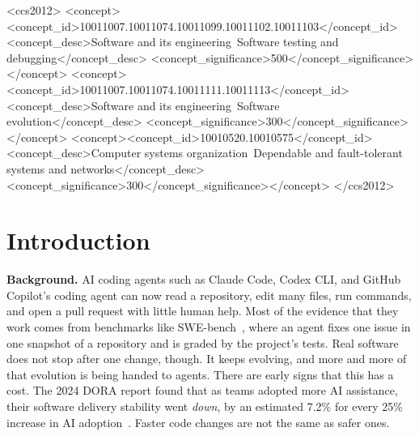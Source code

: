 \documentclass[sigconf,review]{acmart}
\begin{document}
\begin{CCSXML}
<ccs2012>
<concept><concept_id>10011007.10011074.10011099.10011102.10011103</concept_id>
<concept_desc>Software and its engineering~Software testing and debugging</concept_desc>
<concept_significance>500</concept_significance></concept>
<concept><concept_id>10011007.10011074.10011111.10011113</concept_id>
<concept_desc>Software and its engineering~Software evolution</concept_desc>
<concept_significance>300</concept_significance></concept>
<concept><concept_id>10010520.10010575</concept_id>
<concept_desc>Computer systems organization~Dependable and fault-tolerant systems and networks</concept_desc>
<concept_significance>300</concept_significance></concept>
</ccs2012>
\end{CCSXML}


\maketitle

\section{Introduction}

\textbf{Background.} AI coding agents such as Claude Code, Codex CLI,
and GitHub Copilot's coding agent can now read a repository, edit
many files, run commands, and open a pull request with little human
help. Most of the evidence that they work comes from benchmarks
like SWE-bench~\cite{jimenez2024swebench}, where an agent fixes one issue in one snapshot
of a repository and is graded by the project's tests. Real software
does not stop after one change, though. It keeps evolving, and
more and more of that evolution is being handed to agents. There
are early signs that this has a cost. The 2024 DORA report found
that as teams adopted more AI assistance, their software delivery
stability went \emph{down}, by an estimated 7.2\% for every 25\% increase in
AI adoption~\cite{dora2024}. Faster code changes are not the same as safer ones.
\end{document}
